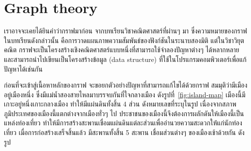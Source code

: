 \chapter{Graph theory}

เราอาจจะเคยได้ยินคำว่ากราฟมาก่อน จากบทเรียนวิชาคณิตศาสตร์ที่ผ่านๆ มา ซึ่งความหมายของกราฟในบทเรียนดังกล่าวนั้น คือการวาดแผนภาพความสัมพันธ์ของฟังก์ชันในระนาบสองมิติ \enskip แต่ในวิชาวิยุตคณิต กราฟจะเป็นโครงสร้างเชิงคณิตศาสตร์แบบหนึ่งที่สามารถใช้จำลองปัญหาต่างๆ ได้หลากหลาย และสามารถนำไปเขียนเป็นโครงสร้างข้อมูล (data structure) ที่ใช้ในโปรแกรมคอมพิวเตอร์เพื่อแก้ปัญหาได้เช่นกัน

ก่อนที่จะเข้าสู่เนื้อหาหลักของกราฟ จะขอยกตัวอย่างปัญหาที่สามารถแก้ไขได้ด้วยกราฟ \enskip สมมุติว่ามีเมืองอยู่เมืองหนึ่ง ซึ่งมีแม่น้ำสองสายไหลมาบรรจบกันที่ใจกลางเมือง ดังรูปที่~\ref{fig:island-map} \enskip เมืองนี้มีเกาะอยู่หนึ่งเกาะกลางเมือง ทำให้มีแผ่นดินทั้งสิ้น 4 ส่วน ดังหมายเลขที่ระบุในรูป \enskip เนื่องจากสภาพภูมิประเทศของเมืองนี้แตกต่างจากเมืองทั่วๆ ไป ประชาชนของเมืองนี้จึงต้องการผลักดันให้เมืองนี้เป็นแหล่งท่องเที่ยว ทำให้มีการสร้างสะพานเชื่อมแผ่นดินแต่ละส่วนเพื่ออำนวยความสะดวกให้่แก่นักท่องเที่ยว \enskip เมื่อการก่อสร้างเสร็จสิ้นแล้ว มีสะพานทั้งสิ้น 5 สะพาน เชื่อมส่วนต่างๆ ของเมืองเช้าด้วยกัน ดังรูป
%
